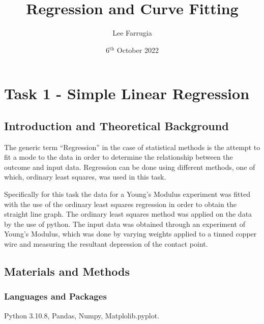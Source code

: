 \documentclass[12pt, a4paper]{article}
\title{Regression and Curve Fitting}
\date{6\(^\text{{th}}\) October 2022}
\author{Lee Farrugia}
\begin{document}
    
\maketitle
\thispagestyle{titlepagestyle}
\pagestyle{mystyle}

\section{Task 1 - Simple Linear Regression}

\subsection{Introduction and Theoretical Background}
The generic term ``Regression'' in the case of statistical methods is the attempt to fit a mode to the data in order to determine the relationship between the outcome and input data. Regression can be done using different methods, one of which, ordinary least squares, was used in this task.

Specifically for this task the data for a Young's Modulus experiment was fitted with the use of the ordinary least squares regression in order to obtain the straight line graph. The ordinary least squares method was applied on the data by the use of python. The input data was obtained through an experiment of Young's Modulus, which was done by varying weights applied to a tinned copper wire and measuring the resultant depression of the contact point.

\subsection{Materials and Methods}

\subsubsection{Languages and Packages}
Python 3.10.8, Pandas, Numpy, Matplolib.pyplot.
\end{document}

